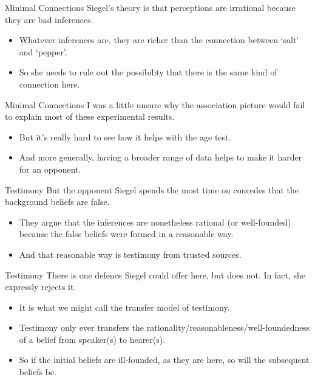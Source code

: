 \documentclass[
  17pt,
  letterpaper,
  ignorenonframetext,
  aspectratio=169,
  handout,
  xcolor={dvipsnames}]{beamer}
\providecommand{\tightlist}{%
  \setlength{\itemsep}{0pt}\setlength{\parskip}{0pt}}\usepackage{longtable,booktabs,array}
\begin{document}
\begin{frame}{Minimal Connections}
\protect\hypertarget{minimal-connections-1}{}
Siegel's theory is that perceptions are irrational because they are bad
inferences.

\begin{itemize}[<+->]
\tightlist
\item
  Whatever inferences are, they are richer than the connection between
  `salt' and `pepper'.
\item
  So she needs to rule out the possibility that there is the same kind
  of connection here.
\end{itemize}
\end{frame}

\begin{frame}{Minimal Connections}
\protect\hypertarget{minimal-connections-2}{}
I was a little unsure why the association picture would fail to explain
most of these experimental results.

\begin{itemize}[<+->]
\tightlist
\item
  But it's really hard to see how it helps with the age test.
\item
  And more generally, having a broader range of data helps to make it
  harder for an opponent.
\end{itemize}
\end{frame}

\begin{frame}{Testimony}
\protect\hypertarget{testimony}{}
But the opponent Siegel spends the most time on concedes that the
background beliefs are false.

\begin{itemize}[<+->]
\tightlist
\item
  They argue that the inferences are nonetheless rational (or
  well-founded) because the false beliefs were formed in a reasonable
  way.
\item
  And that reasonable way is testimony from trusted sources.
\end{itemize}
\end{frame}

\begin{frame}{Testimony}
\protect\hypertarget{testimony-1}{}
There is one defence Siegel could offer here, but does not. In fact, she
expressly rejects it.

\begin{itemize}[<+->]
\tightlist
\item
  It is what we might call the transfer model of testimony.
\item
  Testimony only ever transfers the
  rationality/reasonableness/well-foundedness of a belief from
  speaker(s) to hearer(s).
\item
  So if the initial beliefs are ill-founded, as they are here, so will
  the subsequent beliefs be.
\end{itemize}
\end{frame}
\end{document}
